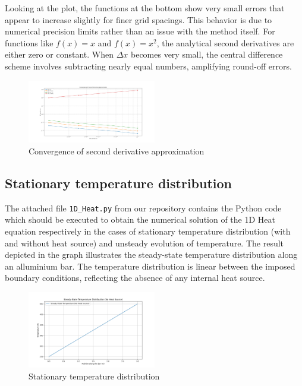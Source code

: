 \documentclass{article}
\begin{document}
Looking at the plot, the functions at the bottom show very small errors that appear to increase slightly for finer grid spacings. 
This behavior is due to numerical precision limits rather than an issue with the method itself. For functions like \(f(x) = x\) and \(f(x) = x^2\),
the analytical second derivatives are either zero or constant. When $\Delta x$ becomes very small, the central difference scheme involves
subtracting nearly equal numbers, amplifying round-off errors.

\begin{figure}[h!]
  \centering
  \includegraphics[width=0.5\textwidth]{Figure_4.png}
  \caption{Convergence of second derivative approximation}
  \label{fig: Convergence of second derivative approximation}
\end{figure}

\subsection{Stationary temperature distribution}

The attached file \texttt{1D\_Heat.py} from our repository \cite{GitHubRepo} contains the Python code which should be executed to obtain 
the numerical solution of the 1D Heat equation respectively in the cases of stationary temperature distribution (with and without heat source) 
and unsteady evolution of temperature. The result depicted in the graph illustrates the steady-state temperature distribution along an alluminium
bar. The temperature distribution is linear between the imposed boundary conditions, reflecting the absence of any internal heat source.

\begin{figure}[h!]
  \centering
  \includegraphics[width=0.5\textwidth]{Figure_1.png}
  \caption{Stationary temperature distribution}
  \label{fig: Stationary temperature distribution}
\end{figure}
\end{document}
